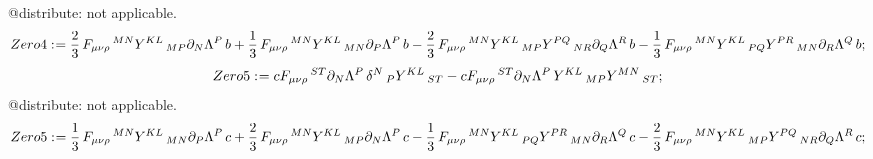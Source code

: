 \documentclass[11pt]{article}
\def\specialcolon{\mathrel{\mathop{:}}\hspace{-.5em}}
\begin{document}
@distribute: not applicable.
\begin{dmath*}[compact, spread=2pt]
Zero4\specialcolon{}= \frac{2}{3}\, {F}_{\mu \nu \rho}\,^{M N} {Y}^{K L}\,_{M P} {\partial}_{N}{{\Lambda}^{P}}\,  b + \frac{1}{3}\, {F}_{\mu \nu \rho}\,^{M N} {Y}^{K L}\,_{M N} {\partial}_{P}{{\Lambda}^{P}}\,  b - \frac{2}{3}\, {F}_{\mu \nu \rho}\,^{M N} {Y}^{K L}\,_{M P} {Y}^{P Q}\,_{N R} {\partial}_{Q}{{\Lambda}^{R}}\,  b - \frac{1}{3}\, {F}_{\mu \nu \rho}\,^{M N} {Y}^{K L}\,_{P Q} {Y}^{P R}\,_{M N} {\partial}_{R}{{\Lambda}^{Q}}\,  b;
\end{dmath*}
\begin{dmath*}[compact, spread=2pt]
Zero5\specialcolon{}= c {F}_{\mu \nu \rho}\,^{S T} {\partial}_{N}{{\Lambda}^{P}}\,  {\delta}^{N}\,_{P} {Y}^{K L}\,_{S T} - c {F}_{\mu \nu \rho}\,^{S T} {\partial}_{N}{{\Lambda}^{P}}\,  {Y}^{K L}\,_{M P} {Y}^{M N}\,_{S T};
\end{dmath*}
@distribute: not applicable.
\begin{dmath*}[compact, spread=2pt]
Zero5\specialcolon{}= \frac{1}{3}\, {F}_{\mu \nu \rho}\,^{M N} {Y}^{K L}\,_{M N} {\partial}_{P}{{\Lambda}^{P}}\,  c + \frac{2}{3}\, {F}_{\mu \nu \rho}\,^{M N} {Y}^{K L}\,_{M P} {\partial}_{N}{{\Lambda}^{P}}\,  c - \frac{1}{3}\, {F}_{\mu \nu \rho}\,^{M N} {Y}^{K L}\,_{P Q} {Y}^{P R}\,_{M N} {\partial}_{R}{{\Lambda}^{Q}}\,  c - \frac{2}{3}\, {F}_{\mu \nu \rho}\,^{M N} {Y}^{K L}\,_{M P} {Y}^{P Q}\,_{N R} {\partial}_{Q}{{\Lambda}^{R}}\,  c;
\end{dmath*}
\end{document}
